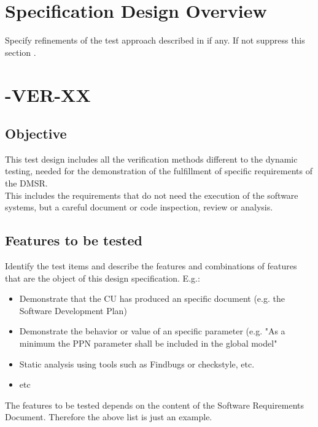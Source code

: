 \documentclass[DM,lsstdraft,STS,toc]{lsstdoc}
\begin{document}
\section{Specification Design Overview \label{sect:design}}
Specify refinements of the test approach described in  if any.
If not suppress this section .

\section{\product-VER-XX \label{sect:designid_verification}}

\subsection{Objective \label{sect:designobj}}
This test design includes all the verification methods different to the dynamic testing, needed for the
demonstration of the fulfillment of specific requirements of the DMSR.\\
This includes  the requirements that do not need the execution of the software systems, but a careful document or code inspection, review
or analysis.

\subsection{Features to be tested \label{sect:totest}}
Identify the test items and describe the features and combinations of features that are the object of this design
specification. E.g.:\\
\begin{itemize}
\item Demonstrate that the CU has produced an specific document (e.g. the Software Development Plan)
\item Demonstrate the behavior or value of an specific parameter (e.g. "As a minimum the PPN parameter shall be included in
the global model"
\item Static analysis using tools such as Findbugs or checkstyle, etc.
\item etc
\end{itemize}
The features to be tested depends on the content of the Software Requirements Document. Therefore the above list is just
an example.
\end{document}
